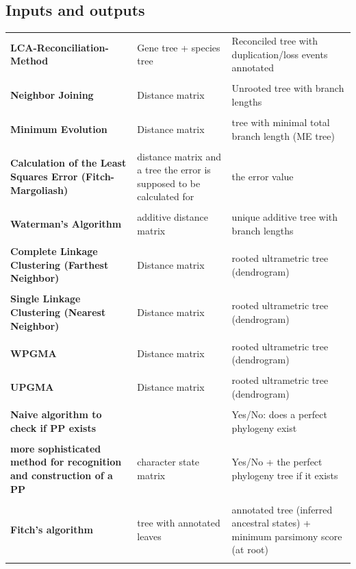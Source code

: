 \subsection{Inputs and outputs}
\begin{table}[H]
\centering
   \begin{tabular}{p{5cm}p{4cm}p{4cm}}  
        \textbf{LCA-Reconciliation-Method} & Gene tree + species tree  & Reconciled tree with duplication/loss events annotated \\ \\
        \textbf{Neighbor Joining} & Distance matrix & Unrooted tree with branch lengths  \\ \\
        \textbf{Minimum Evolution} & Distance matrix &  tree with minimal total branch length (ME tree) \\ \\
        \textbf{Calculation of the Least Squares Error (Fitch-Margoliash)} & distance matrix and a tree the error is supposed to be calculated for & the error value \\ \\
        \textbf{Waterman's Algorithm} & additive distance matrix & unique additive tree with branch lengths \\ \\
        \textbf{Complete Linkage Clustering (Farthest Neighbor)} & Distance matrix & rooted ultrametric tree (dendrogram) \\ \\
        \textbf{Single Linkage Clustering (Nearest Neighbor)}  &  Distance matrix &  rooted ultrametric tree (dendrogram)\\  \\
        \textbf{WPGMA} & Distance matrix & rooted ultrametric tree (dendrogram) \\ \\
        \textbf{UPGMA} & Distance matrix & rooted ultrametric tree (dendrogram) \\ \\
        \textbf{Naive algorithm to check if PP exists} & &  Yes/No: does a perfect phylogeny exist\\ \\
        \textbf{more sophisticated method for recognition and construction of a PP} & character state matrix &Yes/No + the perfect phylogeny tree if it exists \\ \\
        \textbf{Fitch's algorithm} & tree with annotated leaves & annotated tree (inferred ancestral states) + minimum parsimony score (at root) \\ \\

\end{tabular}
\end{table}
